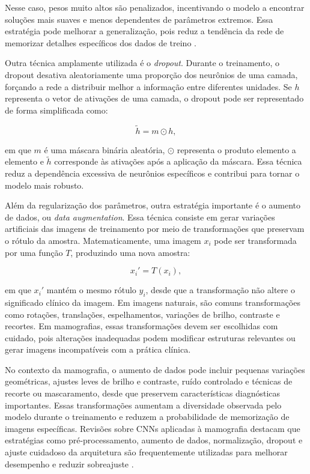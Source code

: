 \documentclass[
    12pt,
    openright,
    oneside,
    a4paper,
    english,
    brazil
]{abntex2}
\begin{document}
Nesse caso, pesos muito altos são penalizados, incentivando o modelo a encontrar soluções mais suaves e menos dependentes de parâmetros extremos. Essa estratégia pode melhorar a generalização, pois reduz a tendência da rede de memorizar detalhes específicos dos dados de treino \cite{goodfellow2016deep}.

Outra técnica amplamente utilizada é o \textit{dropout}. Durante o treinamento, o dropout desativa aleatoriamente uma proporção dos neurônios de uma camada, forçando a rede a distribuir melhor a informação entre diferentes unidades. Se \(h\) representa o vetor de ativações de uma camada, o dropout pode ser representado de forma simplificada como:

\[
\tilde{h} = m \odot h,
\]

em que \(m\) é uma máscara binária aleatória, \(\odot\) representa o produto elemento a elemento e \(\tilde{h}\) corresponde às ativações após a aplicação da máscara. Essa técnica reduz a dependência excessiva de neurônios específicos e contribui para tornar o modelo mais robusto.

Além da regularização dos parâmetros, outra estratégia importante é o aumento de dados, ou \textit{data augmentation}. Essa técnica consiste em gerar variações artificiais das imagens de treinamento por meio de transformações que preservam o rótulo da amostra. Matematicamente, uma imagem \(x_i\) pode ser transformada por uma função \(T\), produzindo uma nova amostra:

\[
x_i' = T(x_i),
\]

em que \(x_i'\) mantém o mesmo rótulo \(y_i\), desde que a transformação não altere o significado clínico da imagem. Em imagens naturais, são comuns transformações como rotações, translações, espelhamentos, variações de brilho, contraste e recortes. Em mamografias, essas transformações devem ser escolhidas com cuidado, pois alterações inadequadas podem modificar estruturas relevantes ou gerar imagens incompatíveis com a prática clínica.

No contexto da mamografia, o aumento de dados pode incluir pequenas variações geométricas, ajustes leves de brilho e contraste, ruído controlado e técnicas de recorte ou mascaramento, desde que preservem características diagnósticas importantes. Essas transformações aumentam a diversidade observada pelo modelo durante o treinamento e reduzem a probabilidade de memorização de imagens específicas. Revisões sobre CNNs aplicadas à mamografia destacam que estratégias como pré-processamento, aumento de dados, normalização, dropout e ajuste cuidadoso da arquitetura são frequentemente utilizadas para melhorar desempenho e reduzir sobreajuste \cite{abdelhafiz2019deep}.
\end{document}
